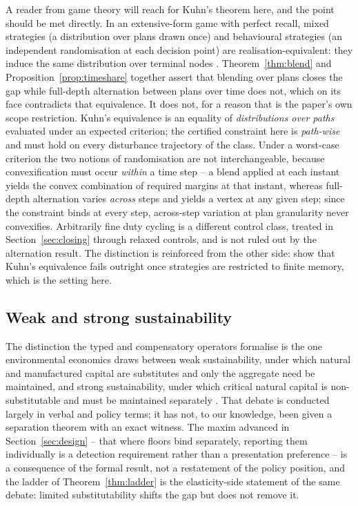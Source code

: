 A reader from game theory will reach for Kuhn's theorem here, and the point should be met directly. In an extensive-form game with perfect recall, mixed strategies (a distribution over plans drawn once) and behavioural strategies (an independent randomisation at each decision point) are realisation-equivalent: they induce the same distribution over terminal nodes \citep{Kuhn1953}. Theorem~\ref{thm:blend} and Proposition~\ref{prop:timeshare} together assert that blending over plans closes the gap while full-depth alternation between plans over time does not, which on its face contradicts that equivalence. It does not, for a reason that is the paper's own scope restriction. Kuhn's equivalence is an equality of \emph{distributions over paths} evaluated under an expected criterion; the certified constraint here is \emph{path-wise} and must hold on every disturbance trajectory of the class. Under a worst-case criterion the two notions of randomisation are not interchangeable, because convexification must occur \emph{within} a time step -- a blend applied at each instant yields the convex combination of required margins at that instant, whereas full-depth alternation varies \emph{across} steps and yields a vertex at any given step; since the constraint binds at every step, across-step variation at plan granularity never convexifies. Arbitrarily fine duty cycling is a different control class, treated in Section~\ref{sec:closing} through relaxed controls, and is not ruled out by the alternation result. The distinction is reinforced from the other side: \citet{MainRandour2024} show that Kuhn's equivalence fails outright once strategies are restricted to finite memory, which is the setting here.

\subsection{Weak and strong sustainability}

The distinction the typed and compensatory operators formalise is the one environmental economics draws between weak sustainability, under which natural and manufactured capital are substitutes and only the aggregate need be maintained, and strong sustainability, under which critical natural capital is non-substitutable and must be maintained separately \citep{PearceAtkinson1993,Beckerman1994,Daly1995,Ayres2001,Neumayer2013,DietzNeumayer2007}. That debate is conducted largely in verbal and policy terms; it has not, to our knowledge, been given a separation theorem with an exact witness. The maxim advanced in Section~\ref{sec:design} -- that where floors bind separately, reporting them individually is a detection requirement rather than a presentation preference -- is a consequence of the formal result, not a restatement of the policy position, and the ladder of Theorem~\ref{thm:ladder} is the elasticity-side statement of the same debate: limited substitutability shifts the gap but does not remove it.

